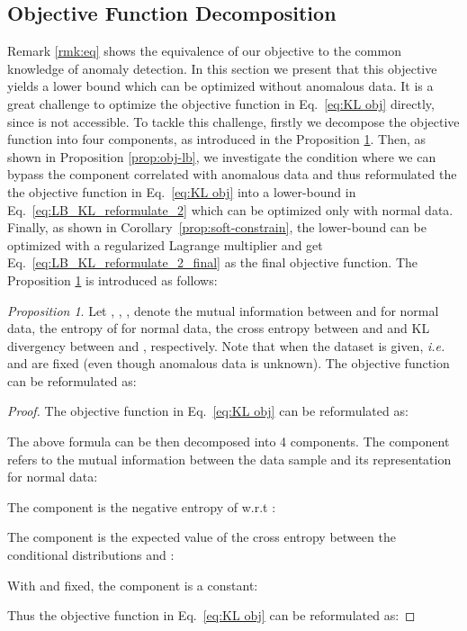 \documentclass[journal]{IEEEtran}
\theoremstyle{remark}
\newtheorem{proposition}{Proposition}
\begin{document}
\vspace{-0.5cm}
\subsection{Objective Function Decomposition}

Remark \ref{rmk:eq} shows the equivalence of our objective to the common knowledge of anomaly detection. In this section we present that this objective yields a lower bound which can be optimized without anomalous data. It is a great challenge to optimize the objective function in Eq.~\ref{eq:KL obj} directly, since  is not accessible. To tackle this challenge,  firstly we decompose the objective function into four components, as introduced in the Proposition \ref{prop:KL-decompose}. Then, as shown in Proposition \ref{prop:obj-lb}, we investigate the condition where we can bypass the component correlated with anomalous data and thus reformulated the the objective function in Eq.~\ref{eq:KL obj} into a lower-bound in Eq.~\ref{eq:LB_KL_reformulate_2} which can be optimized only with normal data. Finally, as shown in Corollary~\ref{prop:soft-constrain}, the lower-bound can be optimized with a regularized Lagrange multiplier and get Eq.~\ref{eq:LB_KL_reformulate_2_final} as the final objective function. The Proposition \ref{prop:KL-decompose} is introduced as follows:

\begin{proposition}\label{prop:KL-decompose}
Let , , ,  denote the mutual information between  and  for normal data, the entropy of  for normal data, the cross entropy between  and  and KL divergency between  and , respectively. Note that when the dataset is given, \textit{i.e.}  and  are fixed (even though anomalous data is unknown). The objective function can be reformulated as:

\end{proposition}
\begin{proof}
The objective function in Eq.~\ref{eq:KL obj} can be reformulated as:

The above formula can be then decomposed into 4 components. 
The  component refers to the mutual information between the data sample  and its representation  for normal data:

The  component is the negative entropy of  w.r.t :

The  component is the expected value of the cross entropy between the conditional distributions  and :

With  and  fixed, the  component is a constant:

Thus the objective function in Eq.~\ref{eq:KL obj} can be reformulated as:

\end{proof}
\end{document}

